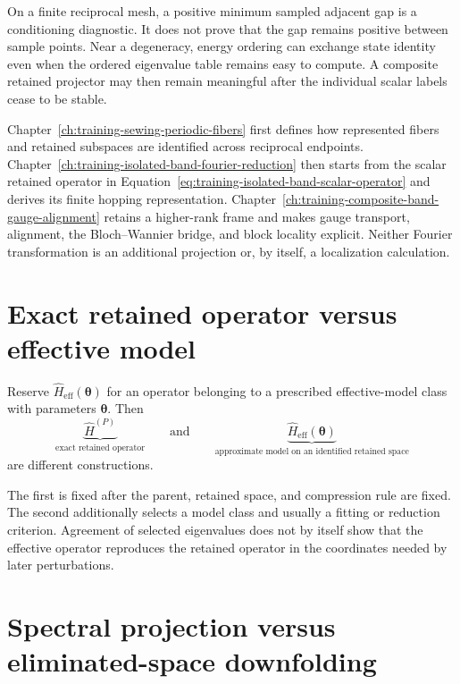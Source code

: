 On a finite reciprocal mesh, a positive minimum sampled adjacent gap is a
conditioning diagnostic. It does not prove that the gap remains positive
between sample points. Near a degeneracy, energy ordering can exchange state
identity even when the ordered eigenvalue table remains easy to compute. A
composite retained projector may then remain meaningful after the individual
scalar labels cease to be stable.

Chapter~\ref{ch:training-sewing-periodic-fibers} first defines how represented
fibers and retained subspaces are identified across reciprocal endpoints.
Chapter~\ref{ch:training-isolated-band-fourier-reduction} then starts from the
scalar retained operator in
Equation~\eqref{eq:training-isolated-band-scalar-operator} and derives its
finite hopping representation. Chapter~\ref{ch:training-composite-band-gauge-alignment}
retains a higher-rank frame and makes gauge transport, alignment, the
Bloch--Wannier bridge, and block locality explicit. Neither Fourier
transformation is an additional projection or, by itself, a localization
calculation.

\section{Exact retained operator versus effective model}

Reserve \(\hat H_{\mathrm{eff}}(\boldsymbol\theta)\) for an operator belonging
to a prescribed effective-model class with parameters \(\boldsymbol\theta\).
Then
\begin{equation}
  \underbrace{\hat H^{(P)}}_{\text{exact retained operator}}
  \qquad\text{and}\qquad
  \underbrace{\hat H_{\mathrm{eff}}(\boldsymbol\theta)}_{
    \text{approximate model on an identified retained space}}
\end{equation}
are different constructions.

The first is fixed after the parent, retained space, and compression rule are
fixed. The second additionally selects a model class and usually a fitting or
reduction criterion. Agreement of selected eigenvalues does not by itself show
that the effective operator reproduces the retained operator in the coordinates
needed by later perturbations.

\section{Spectral projection versus eliminated-space downfolding}

